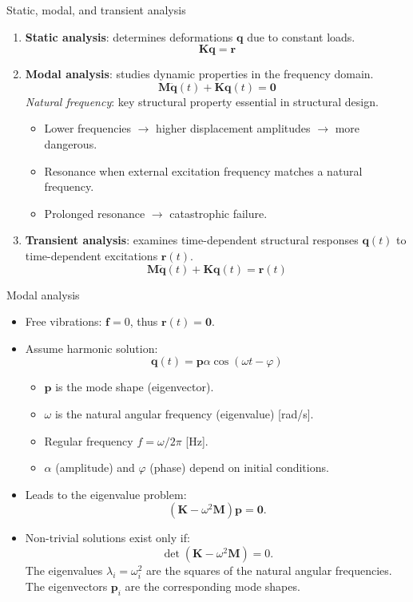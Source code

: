 \documentclass[aspectratio=169]{beamer}
\begin{document}
\begin{frame}{Static, modal, and transient analysis}
  \begin{enumerate}
    \item \textbf{Static analysis}: determines deformations $\mathbf q$ due to constant loads.
          $$\mathbf K\mathbf q=\mathbf r$$
    \item  \textbf{Modal analysis}: studies dynamic properties in the frequency domain.
          $$\mathbf M\ddot{\mathbf q}(t)+\mathbf K\mathbf q(t)=\mathbf 0$$
          \emph{Natural frequency}: key structural property  essential in structural design.
          \begin{itemize}
            \item Lower frequencies $\rightarrow$ higher displacement amplitudes $\rightarrow$ more dangerous.
            \item Resonance when external excitation frequency matches a natural frequency.
            \item Prolonged resonance $\rightarrow$ catastrophic failure.
          \end{itemize}
    \item   \textbf{Transient analysis}: examines time-dependent structural responses $\mathbf q(t)$  to time-dependent excitations $\mathbf r(t)$.
          $$\mathbf M\ddot{\mathbf q}(t)+\mathbf K\mathbf q(t)=\mathbf r(t)$$
  \end{enumerate}
\end{frame}

\begin{frame}{Modal analysis}
  \begin{itemize}
    \item Free vibrations: $\mathbf f=0$, thus $\mathbf r(t)=\mathbf 0$.
    \item Assume harmonic solution: $$\mathbf q(t)=\mathbf p \alpha \cos (\omega t-\varphi)$$
          \vspace{-0.6cm}
          \begin{itemize}
            \item $\mathbf p$ is the mode shape (eigenvector).
            \item $\omega$ is the natural angular frequency (eigenvalue) [rad/s].
            \item Regular frequency $f=\omega/2\pi$ [Hz].
            \item $\alpha$ (amplitude) and $\varphi$ (phase) depend on initial conditions.
          \end{itemize}
    \item Leads to the eigenvalue problem:
          $$(\mathbf K-\omega^2\mathbf M)\mathbf p=\mathbf 0.$$
    \item Non-trivial solutions exist only if:
          $$\det(\mathbf K-\omega^2\mathbf M)=0.$$
          The eigenvalues $\lambda_i=\omega_i^2$ are the squares of the natural angular frequencies. \newline
          The eigenvectors $\mathbf p_i$ are the corresponding mode shapes.
  \end{itemize}
\end{frame}
\end{document}
